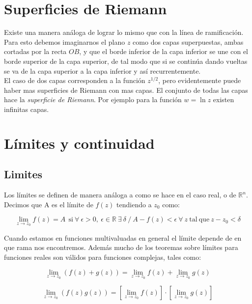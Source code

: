 \documentclass[12pt,a4paper]{book}
\newcommand{\ccorchetes}[1]{\left[ #1  \right]}
\begin{document}
\section{Superficies de Riemann} 

Existe una manera análoga de lograr lo mismo que con la línea de ramificación. Para esto debemos imaginarnos el plano $z$ como dos capas superpuestas, ambas cortadas por la recta $OB$, y que el borde inferior de la capa inferior se une con el borde superior de la capa superior, de tal modo que si se continúa dando vueltas se va de la capa superior a la capa inferior y así recurrentemente. \\

El caso de dos capas corresponden a la función $z^{1/2}$, pero evidentemente puede haber mas superficies de Riemann con mas capas. El conjunto de todas las capas hace la \textit{superficie de Riemann}. Por ejemplo para la función $w = \ln z$ existen infinitas capas.

\section{Límites y continuidad}

\subsection{Limites}

Los límites se definen de manera análoga a como se hace en el caso real, o de $\mathbb{R}^n$. Decimos que A es el límite de $f(z)$ tendiendo a $z_0$ como:

\begin{equation}
\lim_{z \rightarrow z_0} f(z)  = A  \ \ \mathrm{si} \ \forall \ \epsilon > 0, \ \epsilon \in \mathbb{R} \  \exists \ \delta \ / \ A - f(z) < \epsilon   \ \forall \ z \ \mathrm{tal \ que} \ z-z_0 < \delta
 \end{equation}

Cuando estamos en funciones multivaluadas en general el límite depende de en que rama nos encontremos. Además mucho de los teoremas sobre límites para funciones reales son válidos para funciones complejas, tales como:

\begin{equation}
\lim_{z \rightarrow z_0} (f(z)+g(z)) = \lim_{z \rightarrow z_0} f(z) + \lim_{z \rightarrow z_0} g(z)
\end{equation}

\begin{equation}
\lim_{z \rightarrow z_0} (f(z) g(z)) = \ccorchetes{\lim_{z \rightarrow z_0} f(z)} \cdot \ccorchetes{\lim_{z \rightarrow z_0} g(z) }
\end{equation}
\end{document}
